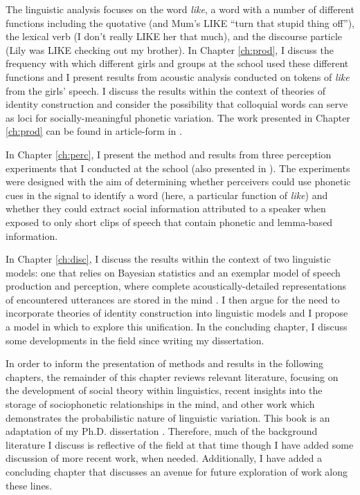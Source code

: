 The linguistic analysis focuses on the word \textit{like}, a word with a number of different functions including the quotative (and Mum's LIKE ``turn that stupid thing off''), the lexical verb (I don't really LIKE her that much), and the discourse particle (Lily was LIKE checking out my brother).  In Chapter \ref{ch:prod}, I discuss the frequency with which different girls and groups at the school used these different functions and I present results from acoustic analysis conducted on tokens of \textit{like} from the girls' speech.  I discuss the results within the context of theories of identity construction and consider the possibility that colloquial words can serve as loci for socially-meaningful phonetic variation.  The work presented in Chapter \ref{ch:prod} can be found in article-form in .


In Chapter \ref{ch:perc}, I present the method and results from three perception experiments that I conducted at the school (also presented in ).  The experiments were designed with the aim of determining whether perceivers could use phonetic cues in the signal to identify a word (here, a particular function of \textit{like}) and whether they could extract social information attributed to a speaker when exposed to only short clips of speech that contain phonetic and lemma-based information.  

In Chapter \ref{ch:disc}, I discuss the results within the context of two linguistic models: one that relies on Bayesian statistics \cite{jurafsky1996,narayananjurafsky2002} and an exemplar model of speech production and perception, where complete acoustically-detailed representations of encountered utterances are stored in the mind \cite{johnson1997,pisoni1997,pierrehumbert2001}.  I then argue for the need to incorporate theories of identity construction into linguistic models and I propose a model in which to explore this unification.  In the concluding chapter, I discuss some developments in the field since writing my dissertation.

In order to inform the presentation of methods and results in the following chapters, the remainder of this chapter reviews relevant literature, focusing on the development of social theory within linguistics, recent insights into the storage of sociophonetic relationships in the mind, and other work which demonstrates the probabilistic nature of linguistic variation.  This book is an adaptation of my Ph.D. dissertation \cite{drager2009-thesis}.  Therefore, much of the background literature I discuss is reflective of the field at that time though I have added some discussion of more recent work, when needed.  Additionally, I have added a concluding chapter that discusses an avenue for future exploration of work along these lines.

